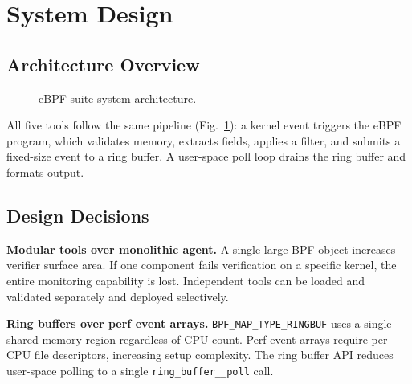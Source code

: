\documentclass[conference]{IEEEtran}
\begin{document}
\section{System Design}

\subsection{Architecture Overview}

\begin{figure}[H]
  \centering
  \caption{eBPF suite system architecture.}
  \label{fig:arch}
\end{figure}

All five tools follow the same pipeline (Fig.~\ref{fig:arch}): a kernel event triggers the eBPF program, which validates memory, extracts fields, applies a filter, and submits a fixed-size event to a ring buffer. A user-space poll loop drains the ring buffer and formats output.

\subsection{Design Decisions}
\textbf{Modular tools over monolithic agent.} A single large BPF object increases verifier surface area. If one component fails verification on a specific kernel, the entire monitoring capability is lost. Independent tools can be loaded and validated separately and deployed selectively.

\textbf{Ring buffers over perf event arrays.} \texttt{BPF\_MAP\_TYPE\_RINGBUF} uses a single shared memory region regardless of CPU count. Perf event arrays require per-CPU file descriptors, increasing setup complexity. The ring buffer API reduces user-space polling to a single \texttt{ring\_buffer\_\_poll} call.
\end{document}
